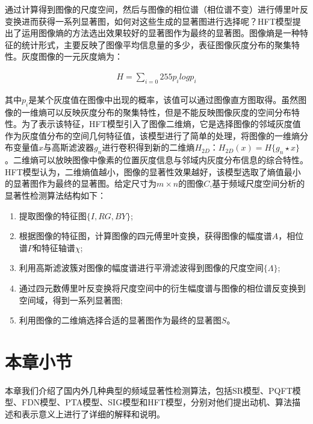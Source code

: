 通过计算得到图像的尺度空间，然后与图像的相位谱（相位谱不变）进行傅里叶反变换进而获得一系列显著图，如何对这些生成的显著图进行选择呢？HFT模型提出了运用图像熵的方法选出效果较好的显著图作为最终的显著图。图像熵\cite{Abutaleb1989Automatic}是一种特征的统计形式，主要反映了图像平均信息量的多少，表征图像灰度分布的聚集特性。灰度图像的一元灰度熵为：
\begin{linenomath}
\begin{align}
H=\sum_{i=0}{255}p_{i}log p_{i}
\label{式3_34}
\end{align}
\end{linenomath}
其中$p_{i}$是某个灰度值在图像中出现的概率，该值可以通过图像直方图取得。虽然图像的一维熵可以反映灰度分布的聚集特性，但是不能反映图像灰度的空间分布特性。为了表示该特征，HFT模型引入了图像二维熵，它是选择图像的邻域灰度值作为灰度值分布的空间几何特征值，该模型进行了简单的处理，将图像的一维熵分布变量值$x$与高斯滤波器$g_{n}$进行卷积得到新的二维熵$H_{2D}$：$H_{2D}(x)=H\{g_{n}\star x\}$。二维熵可以放映图像中像素的位置灰度信息与邻域内灰度分布信息的综合特性。HFT模型认为，二维熵值越小，图像的显著性效果越好，该模型选取了熵值最小的显著图作为最终的显著图。给定尺寸为$m×n$的图像$C$,基于频域尺度空间分析的显著性检测算法结构如下：
\begin{enumerate}
\item 提取图像的特征图$\{I,RG,BY\}$;
\item 根据图像的特征图，计算图像的四元傅里叶变换，获得图像的幅度谱$A$，相位谱$P$和特征轴谱$\chi$;
\item 利用高斯滤波簇对图像的幅度谱进行平滑滤波得到图像的尺度空间$\{\Lambda\}$;
\item 通过四元数傅里叶反变换将尺度空间中的衍生幅度谱与图像的相位谱反变换到空间域，得到一系列显著图;
\item 利用图像的二维熵选择合适的显著图作为最终的显著图$S$。
\end{enumerate}

\section{本章小节}
\label{3_7}

本章我们介绍了国内外几种典型的频域显著性检测算法，包括SR模型、PQFT模型、FDN模型、PTA模型、SIG模型和HFT模型，分别对他们提出动机、算法描述和表示意义上进行了详细的解释和说明。
